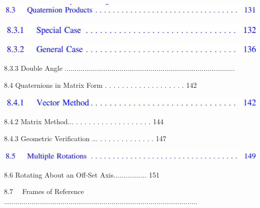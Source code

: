 \documentclass[10pt]{article}
\begin{document}
\begin{center}
\includegraphics[max width=\textwidth]{2023_04_20_41f1ceac5a31dc7d1b59g-013(10)}
\end{center}

\begin{center}
\includegraphics[max width=\textwidth]{2023_04_20_41f1ceac5a31dc7d1b59g-013(6)}
\end{center}

\begin{center}
\includegraphics[max width=\textwidth]{2023_04_20_41f1ceac5a31dc7d1b59g-013(5)}
\end{center}

8.3.3 Double Angle $\ldots \ldots \ldots \ldots \ldots \ldots \ldots \ldots \ldots \ldots \ldots \ldots \ldots \ldots \ldots \ldots \ldots \ldots \ldots \ldots \ldots \ldots \ldots \ldots \ldots \ldots \ldots \ldots \ldots$

8.4 Quaternions in Matrix Form . . . . . . . . . . . . . . . . . . . 142

\begin{center}
\includegraphics[max width=\textwidth]{2023_04_20_41f1ceac5a31dc7d1b59g-013(8)}
\end{center}

8.4.2 Matrix Method... . . . . . . . . . . . . . . . . . . 144

8.4.3 Geometric Verification ... . . . . . . . . . . . . . 147

\begin{center}
\includegraphics[max width=\textwidth]{2023_04_20_41f1ceac5a31dc7d1b59g-013(2)}
\end{center}

8.6 Rotating About an Off-Set Axis................. 151

$8.7 \quad$ Frames of Reference $\ldots \ldots \ldots \ldots \ldots \ldots \ldots \ldots \ldots \ldots \ldots \ldots \ldots \ldots \ldots \ldots \ldots \ldots \ldots \ldots \ldots \ldots \ldots \ldots \ldots \ldots \ldots \ldots \ldots \ldots \ldots \ldots \ldots$
\end{document}
